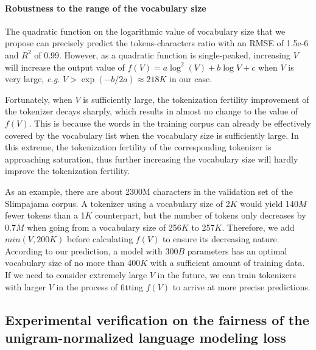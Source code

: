 \paragraph{Robustness to the range of the vocabulary size} The quadratic function on the logarithmic value of vocabulary size that we propose can precisely predict the tokens-characters ratio with an RMSE of 1.5e-6 and $R^2$ of 0.99. However, as a quadratic function is single-peaked, increasing $V$ will increase the output value of $f(V) = a \log^2(V) + b\log V + c$ when $V$ is very large, \textit{e.g.} $V>\exp(-b/2a)\approx 218K$ in our case.

Fortunately, when $V$ is sufficiently large, the tokenization fertility improvement of the tokenizer decays sharply, which results in almost no change to the value of $f(V)$. This is because the words in the training corpus can already be effectively covered by the vocabulary list when the vocabulary size is sufficiently large. In this extreme, the tokenization fertility of the corresponding tokenizer is approaching saturation, thus further increasing the vocabulary size will hardly improve the tokenization fertility.

As an example, there are about 2300M characters in the validation set of the Slimpajama corpus. A tokenizer using a vocabulary size of 2$K$ would yield 140$M$ fewer tokens than a 1$K$ counterpart, but the number of tokens only decreases by 0.7$M$ when going from a vocabulary size of 256$K$ to 257$K$. Therefore, we add $min(V, 200K)$ before calculating $f(V)$ to ensure its decreasing nature. According to our prediction, a model with 300$B$ parameters has an optimal vocabulary size of no more than 400$K$ with a sufficient amount of training data. If we need to consider extremely large $V$ in the future, we can train tokenizers with larger $V$ in the process of fitting $f(V)$ to arrive at more precise predictions.

\subsection{Experimental verification on the fairness of the unigram-normalized language modeling loss}
\label{sec:verification}

